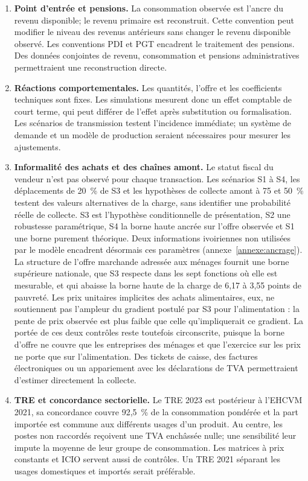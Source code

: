\documentclass[11pt,a4paper]{article}
\begin{document}
\begin{enumerate}
\item \textbf{Point d'entrée et pensions.} La consommation observée est
l'ancre du revenu disponible; le revenu primaire est reconstruit. Cette
convention peut modifier le niveau des revenus antérieurs sans changer le
revenu disponible observé. Les conventions PDI et PGT encadrent le traitement
des pensions. Des données conjointes de revenu, consommation et pensions
administratives permettraient une reconstruction directe.

\item \textbf{Réactions comportementales.} Les quantités, l'offre et les
coefficients techniques sont fixes. Les simulations mesurent donc un effet
comptable de court terme, qui peut différer de l'effet après substitution ou
formalisation. Les scénarios de transmission testent l'incidence immédiate; un
système de demande et un modèle de production seraient nécessaires pour mesurer
les ajustements.

\item \textbf{Informalité des achats et des chaînes amont.} Le statut fiscal du
vendeur n'est pas observé pour chaque transaction. Les scénarios S1 à S4,
les déplacements de 20~\% de S3 et les hypothèses de collecte amont à 75 et
50~\% testent des valeurs alternatives de la charge, sans identifier une
probabilité réelle de collecte. S3 est l'hypothèse conditionnelle de présentation,
S2 une robustesse paramétrique, S4 la borne haute ancrée sur l'offre observée
et S1 une borne purement théorique.
Deux informations ivoiriennes non utilisées par le modèle encadrent désormais ces
paramètres (annexe~\ref{annexe:ancrage}). La structure de l'offre marchande
adressée aux ménages fournit une borne supérieure nationale, que S3 respecte dans
les sept fonctions où elle est mesurable, et qui abaisse la borne haute de la
charge de 6,17 à 3,55 points de pauvreté. Les prix unitaires implicites des
achats alimentaires, eux, ne soutiennent pas l'ampleur du gradient postulé par
S3 pour l'alimentation : la pente de prix observée est plus faible que celle
qu'impliquerait ce gradient. La portée de ces deux contrôles reste toutefois
circonscrite, puisque la borne d'offre ne couvre que les entreprises des ménages
et que l'exercice sur les prix ne porte que sur l'alimentation.
Des tickets de caisse, des factures électroniques ou un appariement avec les
déclarations de TVA permettraient d'estimer directement la collecte.

\item \textbf{TRE et concordance sectorielle.} Le TRE 2023 est postérieur à
l'EHCVM 2021, sa concordance couvre 92,5~\% de la consommation pondérée et la
part importée est commune aux différents usages d'un produit. Au centre, les
postes non raccordés reçoivent une TVA enchâssée nulle; une sensibilité leur
impute la moyenne de leur groupe de consommation. Les matrices à prix constants
et ICIO servent aussi de contrôles. Un TRE 2021 séparant les usages domestiques
et importés serait préférable.


\end{enumerate}
\end{document}
